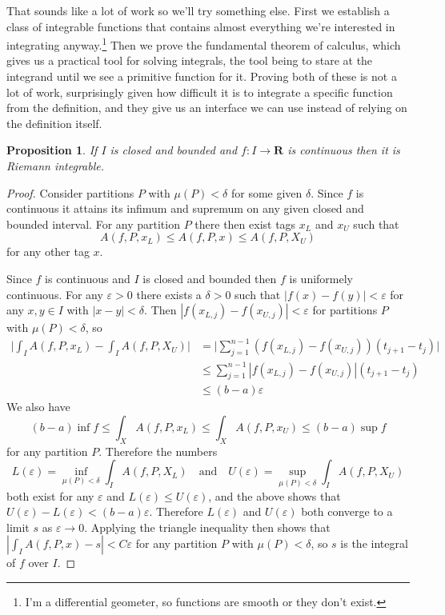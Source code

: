 \documentclass[11pt]{amsart}
\newtheorem{prop}[theo]{Proposition}
\theoremstyle{definition}
\def\qandq{\quad\text{and}\quad}
\def\eps{\varepsilon}
\def\RR{\mathbf{R}}
\begin{document}
That sounds like a lot of work so we'll try something else.
First we establish a class of integrable functions that contains almost everything we're interested in integrating anyway.\footnote{I'm a differential geometer, so functions are smooth or they don't exist.}
Then we prove the fundamental theorem of calculus, which gives us a practical tool for solving integrals, the tool being to stare at the integrand until we see a primitive function for it.
Proving both of these is not a lot of work, surprisingly given how difficult it is to integrate a specific function from the definition, and they give us an interface we can use instead of relying on the definition itself.




\begin{prop}
If $I$ is closed and bounded and $f : I \to \RR$ is continuous then it is Riemann integrable.
\end{prop}

\begin{proof}
Consider partitions $P$ with $\mu(P) < \delta$ for some given $\delta$.
Since $f$ is continuous it attains its infimum and supremum on any given closed and bounded interval.
For any partition $P$ there then exist tags $x_L$ and $x_U$ such that
\[
A(f, P, x_L) \leq A(f, P, x) \leq A(f, P, X_U)
\]
for any other tag $x$.

Since $f$ is continuous and $I$ is closed and bounded then $f$ is uniformely continuous.
For any $\eps > 0$ there exists a $\delta > 0$ such that $|f(x) - f(y)| < \eps$ for any $x,y \in I$ with $|x - y| < \delta$.
Then $|f(x_{L,j}) - f(x_{U,j})| < \eps$ for partitions $P$ with $\mu(P) < \delta$, so 
\begin{align*}
\biggl|\int_I A(f,P,x_L) - \int_I A(f,P,X_U)\biggr|
&= \biggl|
\sum_{j=1}^{n-1} (f(x_{L,j}) - f(x_{U,j})) (t_{j+1} - t_j)
\biggr|
\\
&\leq 
\sum_{j=1}^{n-1} |f(x_{L,j}) - f(x_{U,j})| (t_{j+1} - t_j)
\\
&\leq (b-a) \eps
\end{align*}
We also have
\[
(b-a) \inf f 
\leq \int_X A(f,P,x_L)
\leq \int_X A(f,P,x_U)
\leq (b-a) \sup f 
\]
for any partition $P$.
Therefore the numbers
\[
L(\eps) = \inf_{\mu(P) < \delta} \int_I A(f,P,X_L)
\qandq
U(\eps) = \sup_{\mu(P) < \delta} \int_I A(f,P,X_U)
\]
both exist for any $\eps$ and $L(\eps) \leq U(\eps)$, and the above shows that $U(\eps) - L(\eps) < (b-a)\eps$.
Therefore $L(\eps)$ and $U(\eps)$ both converge to a limit $s$ as $\eps \to 0$.
Applying the triangle inequality then shows that $| \int_I A(f,P,x) - s | < C \eps$ for any partition $P$ with $\mu(P) < \delta$, so $s$ is the integral of $f$ over $I$.
\end{proof}
\end{document}
